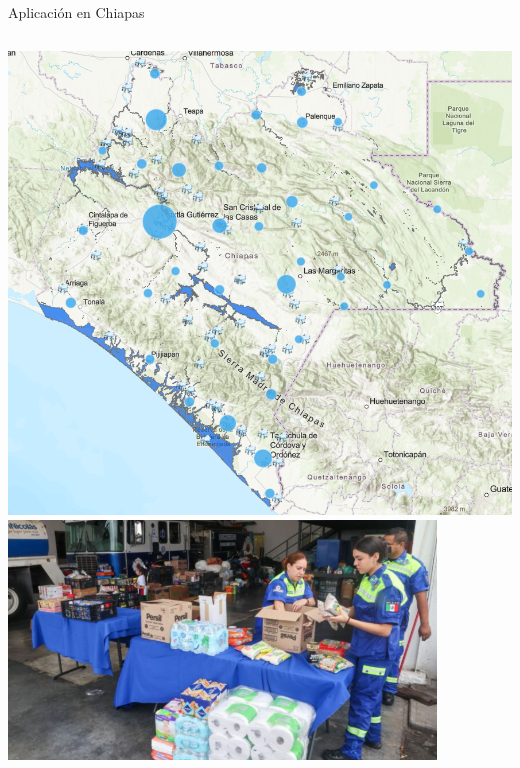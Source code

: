 \documentclass[
  ignorenonframetext,
]{beamer}
\begin{document}
\begin{frame}{Aplicación en Chiapas}
\begin{columns}[T]
\begin{column}{0.4\linewidth}
\includegraphics[width=0.8\linewidth,height=\textheight,keepaspectratio]{chiapas.png}
\includegraphics[width=1\linewidth,height=\textheight,keepaspectratio]{productos.png}
\end{column}
\end{columns}
\end{frame}
\end{document}
